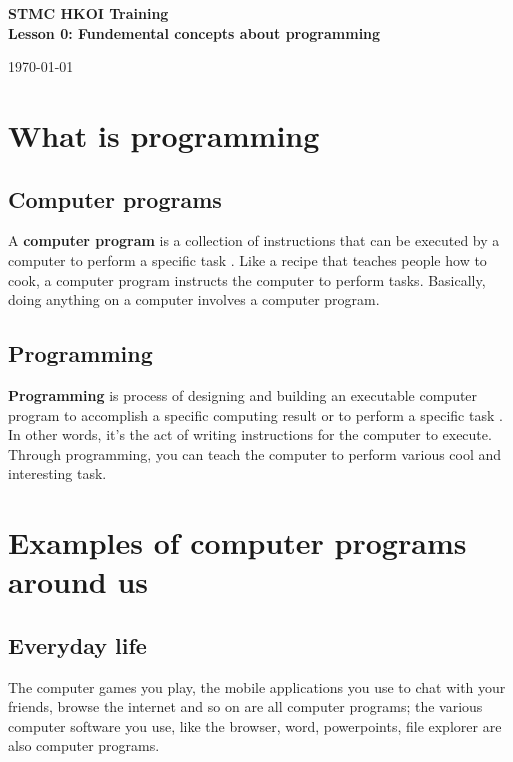 \documentclass[a4paper,12pt]{article}
\begin{document}
\noindent
\begin{minipage}{0.7\textwidth}
\Large{\textbf{STMC HKOI Training}\\
\normalsize{\textbf{Lesson 0: Fundemental concepts about programming}}}
\end{minipage}
\begin{minipage}{0.3\textwidth}
\begin{flushright}
\today\\
\end{flushright}
\end{minipage}
\vspace{1mm}

\section{What is programming}
\subsection{Computer programs}
A \textbf{computer program} is a collection of instructions that can be executed by a computer to perform a specific task \cite{enwiki:Computer_program}. Like a recipe that teaches people how to cook, a computer program instructs the computer to perform tasks. Basically, doing anything on a computer involves a computer program.

\subsection{Programming}

\textbf{Programming} is  process of designing and building an executable computer program to accomplish a specific computing result or to perform a specific task \cite{enwiki:Computer_programming}. In other words, it's the act of writing instructions for the computer to execute. Through programming, you can teach the computer to perform various cool and interesting task.

\section{Examples of computer programs around us}

\subsection{Everyday life}
The computer games you play, the mobile applications you use to chat with your friends, browse the internet and so on are all computer programs; the various computer software you use, like the browser, word, powerpoints, file explorer are also computer programs.
\end{document}
